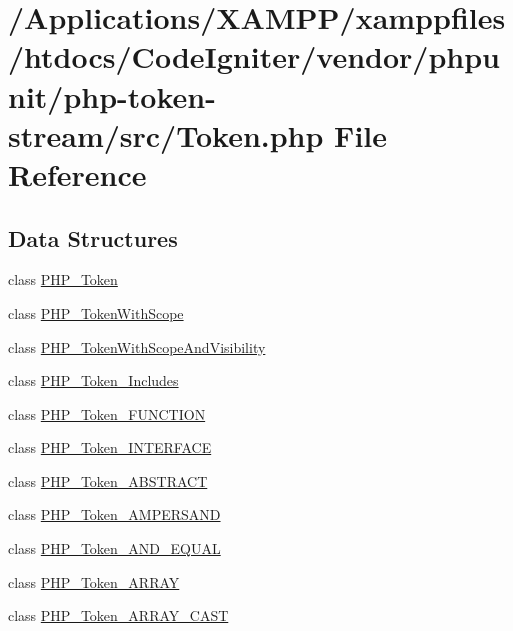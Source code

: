 \hypertarget{_token_8php}{}\section{/\+Applications/\+X\+A\+M\+P\+P/xamppfiles/htdocs/\+Code\+Igniter/vendor/phpunit/php-\/token-\/stream/src/\+Token.php File Reference}
\label{_token_8php}
\subsection*{Data Structures}
\begin{DoxyCompactItemize}
\item 
class \mbox{\hyperlink{class_p_h_p___token}{P\+H\+P\+\_\+\+Token}}
\item 
class \mbox{\hyperlink{class_p_h_p___token_with_scope}{P\+H\+P\+\_\+\+Token\+With\+Scope}}
\item 
class \mbox{\hyperlink{class_p_h_p___token_with_scope_and_visibility}{P\+H\+P\+\_\+\+Token\+With\+Scope\+And\+Visibility}}
\item 
class \mbox{\hyperlink{class_p_h_p___token___includes}{P\+H\+P\+\_\+\+Token\+\_\+\+Includes}}
\item 
class \mbox{\hyperlink{class_p_h_p___token___f_u_n_c_t_i_o_n}{P\+H\+P\+\_\+\+Token\+\_\+\+F\+U\+N\+C\+T\+I\+ON}}
\item 
class \mbox{\hyperlink{class_p_h_p___token___i_n_t_e_r_f_a_c_e}{P\+H\+P\+\_\+\+Token\+\_\+\+I\+N\+T\+E\+R\+F\+A\+CE}}
\item 
class \mbox{\hyperlink{class_p_h_p___token___a_b_s_t_r_a_c_t}{P\+H\+P\+\_\+\+Token\+\_\+\+A\+B\+S\+T\+R\+A\+CT}}
\item 
class \mbox{\hyperlink{class_p_h_p___token___a_m_p_e_r_s_a_n_d}{P\+H\+P\+\_\+\+Token\+\_\+\+A\+M\+P\+E\+R\+S\+A\+ND}}
\item 
class \mbox{\hyperlink{class_p_h_p___token___a_n_d___e_q_u_a_l}{P\+H\+P\+\_\+\+Token\+\_\+\+A\+N\+D\+\_\+\+E\+Q\+U\+AL}}
\item 
class \mbox{\hyperlink{class_p_h_p___token___a_r_r_a_y}{P\+H\+P\+\_\+\+Token\+\_\+\+A\+R\+R\+AY}}
\item 
class \mbox{\hyperlink{class_p_h_p___token___a_r_r_a_y___c_a_s_t}{P\+H\+P\+\_\+\+Token\+\_\+\+A\+R\+R\+A\+Y\+\_\+\+C\+A\+ST}}
\item 

\end{DoxyCompactItemize}
